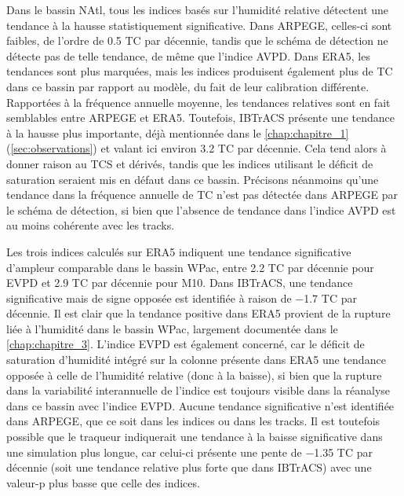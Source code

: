 \documentclass[../main.tex]{subfiles}
\begin{document}
Dans le bassin NAtl, tous les indices basés sur l'humidité relative détectent une tendance à la hausse statistiquement significative. Dans ARPEGE, celles-ci
sont faibles, de l'ordre de \num{0.5} TC par décennie, tandis que le schéma de détection ne détecte pas de telle tendance, de même que l'indice AVPD. Dans ERA5,
les tendances sont plus marquées, mais les indices produisent également plus de TC dans ce bassin par rapport au modèle, du fait de leur calibration différente.
Rapportées à la fréquence annuelle moyenne, les tendances relatives sont en fait semblables entre ARPEGE et ERA5. Toutefois, IBTrACS présente une tendance à la
hausse plus importante, déjà mentionnée dans le \cref{chap:chapitre_1} (\cref{sec:observations}) et valant ici environ \num{3.2} TC par décennie. Cela tend
alors à donner raison au TCS et dérivés, tandis que les indices utilisant le déficit de saturation seraient mis en défaut dans ce bassin. Précisons néanmoins
qu'une tendance dans la fréquence annuelle de TC n'est pas détectée dans ARPEGE par le schéma de détection, si bien que l'absence de tendance dans l'indice AVPD
est au moins cohérente avec les tracks.

Les trois indices calculés sur ERA5 indiquent une tendance significative d'ampleur comparable dans le bassin WPac, entre \num{2.2} TC par décennie pour EVPD et
\num{2.9} TC par décennie pour M10. Dans IBTrACS, une tendance significative mais de signe opposée est identifiée à raison de \num{-1.7} TC par décennie. Il est
clair que la tendance positive dans ERA5 provient de la rupture liée à l'humidité dans le bassin WPac, largement documentée dans le \cref{chap:chapitre_3}.
L'indice EVPD est également concerné, car le déficit de saturation d'humidité intégré sur la colonne présente dans ERA5 une tendance opposée à celle de
l'humidité relative (donc à la baisse), si bien que la rupture dans la variabilité interannuelle de l'indice est toujours visible dans la réanalyse dans ce
bassin avec l'indice EVPD. Aucune tendance significative n'est identifiée dans ARPEGE, que ce soit dans les indices ou dans les tracks. Il est toutefois
possible que le traqueur indiquerait une tendance à la baisse significative dans une simulation plus longue, car celui-ci présente une pente de \num{-1.35} TC
par décennie (soit une tendance relative plus forte que dans IBTrACS) avec une valeur-p plus basse que celle des indices.
\end{document}
